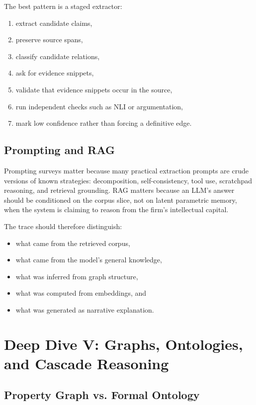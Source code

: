 \documentclass[11pt]{article}
\begin{document}
The best pattern is a staged extractor:

\begin{enumerate}
\item extract candidate claims,
\item preserve source spans,
\item classify candidate relations,
\item ask for evidence snippets,
\item validate that evidence snippets occur in the source,
\item run independent checks such as NLI or argumentation,
\item mark low confidence rather than forcing a definitive edge.
\end{enumerate}

\subsection{Prompting and RAG}

Prompting surveys matter because many practical extraction prompts are crude
versions of known strategies: decomposition, self-consistency, tool use,
scratchpad reasoning, and retrieval grounding. RAG matters because an LLM's
answer should be conditioned on the corpus slice, not on latent parametric
memory, when the system is claiming to reason from the firm's intellectual
capital.

The trace should therefore distinguish:

\begin{itemize}
\item what came from the retrieved corpus,
\item what came from the model's general knowledge,
\item what was inferred from graph structure,
\item what was computed from embeddings, and
\item what was generated as narrative explanation.
\end{itemize}

\section{Deep Dive V: Graphs, Ontologies, and Cascade Reasoning}

\subsection{Property Graph vs. Formal Ontology}
\end{document}
